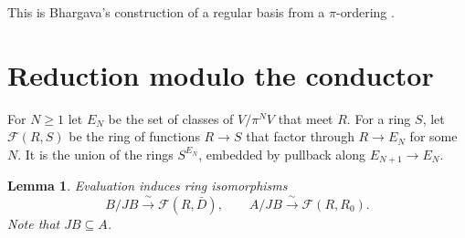 \documentclass[11pt,a4paper]{article}
\theoremstyle{plain}
\newtheorem{lemma}[theorem]{Lemma}
\theoremstyle{remark}
\newcommand{\Fn}{\mathcal F}
\begin{document}
This is Bhargava's construction of a regular basis from a $\pi$-ordering \cite{Bha}.

\section{Reduction modulo the conductor}

For $N\geq1$ let $E_N$ be the set of classes of $V/\pi^NV$ that meet $R$. For a ring $S$, let $\Fn(R,S)$ be the ring
of functions $R\to S$ that factor through $R\to E_N$ for some $N$. It is the union of the rings $S^{E_N}$, embedded
by pullback along $E_{N+1}\to E_N$.

\begin{lemma}\label{lem:indicators}
Evaluation induces ring isomorphisms
\[
 B/JB\xrightarrow{\ \sim\ }\Fn(R,\bar D),\qquad A/JB\xrightarrow{\ \sim\ }\Fn(R,R_0).
\]
Note that $JB\subseteq A$.
\end{lemma}
\end{document}

